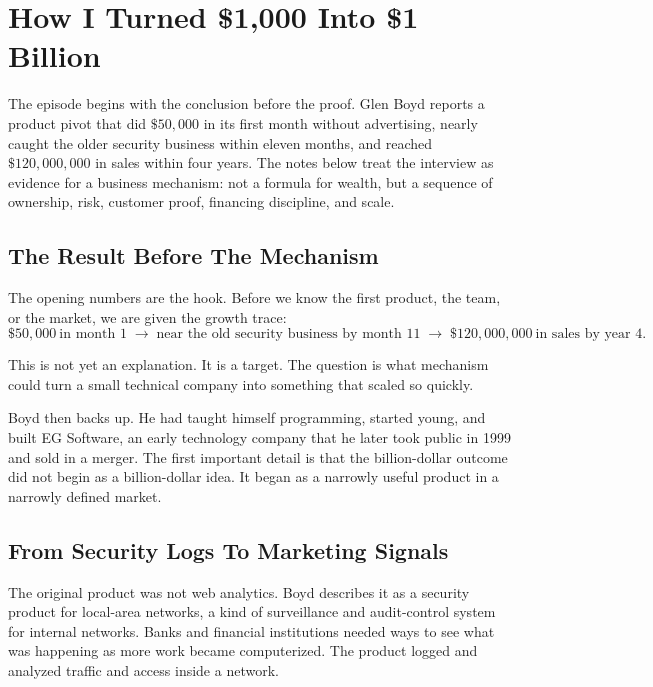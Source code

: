 \chapter{How I Turned \texorpdfstring{\$1,000}{1000 Dollars} Into \texorpdfstring{\$1 Billion}{1 Billion Dollars}}

The episode begins with the conclusion before the proof. Glen Boyd reports a product pivot that did \(\$50{,}000\) in its first month without advertising, nearly caught the older security business within eleven months, and reached \(\$120{,}000{,}000\) in sales within four years. The notes below treat the interview as evidence for a business mechanism: not a formula for wealth, but a sequence of ownership, risk, customer proof, financing discipline, and scale.

\section{The Result Before The Mechanism}

The opening numbers are the hook. Before we know the first product, the team, or the market, we are given the growth trace:
\begin{equation}
\$50{,}000\ \text{in month 1}
\;\longrightarrow\;
\text{near the old security business by month 11}
\;\longrightarrow\;
\$120{,}000{,}000\ \text{in sales by year 4}.
\end{equation}

This is not yet an explanation. It is a target. The question is what mechanism could turn a small technical company into something that scaled so quickly.

Boyd then backs up. He had taught himself programming, started young, and built EG Software, an early technology company that he later took public in 1999 and sold in a merger. The first important detail is that the billion-dollar outcome did not begin as a billion-dollar idea. It began as a narrowly useful product in a narrowly defined market.

\section{From Security Logs To Marketing Signals}

The original product was not web analytics. Boyd describes it as a security product for local-area networks, a kind of surveillance and audit-control system for internal networks. Banks and financial institutions needed ways to see what was happening as more work became computerized. The product logged and analyzed traffic and access inside a network.

